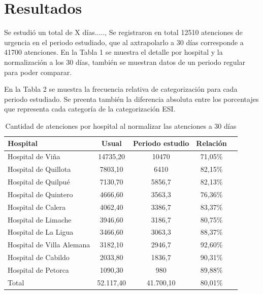 \documentclass{article}
\begin{document}
\section{Resultados}

Se estudió un total de X días....., Se registraron en total 12510 atenciones de urgencia en el periodo estudiado, que al axtrapolarlo a 30 días corresponde a 41700 atenciones. En la Tabla 1 se muestra el detalle por hospital y la normalización a los 30 días, también se muestran datos de un periodo regular para poder comparar.

En la Tabla 2 se muestra la frecuencia relativa de categorización para cada periodo estudiado. Se preenta también la diferencia absoluta entre los porcentajes que representa cada categoría de la categorización ESI.


\begin{table}[H]
\centering
\begin{tabular}{@{}lcccc@{}}
\toprule
\textbf{Hospital}         & \textbf{Usual} & \textbf{Periodo estudio} & \textbf{Relación} \\ \midrule
Hospital de Viña          & 14735,20       & 10470                    & 71,05\%           \\
Hospital de Quillota      & 7803,10        & 6410                     & 82,15\%           \\
Hospital de Quilpué       & 7130,70        & 5856,7                   & 82,13\%           \\
Hospital de Quintero      & 4666,60        & 3563,3                   & 76,36\%           \\
Hospital de Calera        & 4062,40        & 3386,7                   & 83,37\%           \\
Hospital de Limache       & 3946,60        & 3186,7                   & 80,75\%           \\
Hospital de La Ligua      & 3466,60        & 3063,3                   & 88,37\%           \\
Hospital de Villa Alemana & 3182,10        & 2946,7                   & 92,60\%           \\
Hospital de Cabildo       & 2033,80        & 1836,7                   & 90,31\%           \\
Hospital de Petorca       & 1090,30        & 980                      & 89,88\%           \\ 
Total                     & 52.117,40      & 41.700,10                & 80,01\%           \\ \bottomrule
\end{tabular}
\caption{Cantidad de atenciones por hospital al normalizar las atenciones a 30 días}
\end{table}
\end{document}
